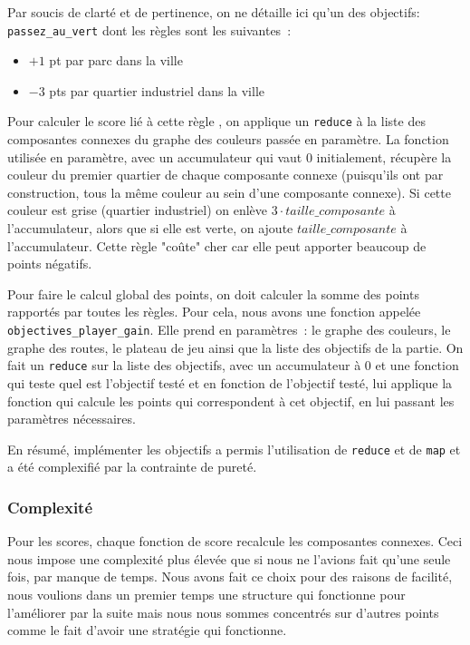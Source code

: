 Par soucis de clarté et de pertinence, on ne détaille ici qu'un des objectifs: \texttt{passez\_au\_vert} dont les règles sont les suivantes~:
\begin{itemize}
    \item  $+1$ pt par parc dans la ville
    \item  $-3$ pts par quartier industriel dans la ville
\end{itemize}

Pour calculer le score lié à cette règle , on applique un \texttt{reduce} à la liste des composantes connexes du graphe des couleurs passée en paramètre. La fonction utilisée en paramètre, avec un accumulateur qui vaut 0 initialement, récupère la couleur du premier quartier de chaque composante connexe (puisqu'ils ont par construction, tous la même couleur au sein d'une composante connexe). Si cette couleur est grise (quartier industriel) on enlève $3 \cdot taille\_composante$ à l'accumulateur, alors que si elle est verte, on ajoute $taille\_composante$ à l'accumulateur.
Cette règle "coûte" cher car elle peut apporter beaucoup de points négatifs.

Pour faire le calcul global des points, on doit calculer la somme des points rapportés par toutes les règles. Pour cela, nous avons une fonction appelée \texttt{objectives\_player\_gain}. Elle prend en paramètres~: le graphe des couleurs, le graphe des routes, le plateau de jeu ainsi que la liste des objectifs de la partie. On fait un \texttt{reduce} sur la liste des objectifs, avec un accumulateur à 0 et une fonction qui teste quel est l'objectif testé et en fonction de l'objectif testé, lui applique la fonction qui calcule les points qui correspondent à cet objectif, en lui passant les paramètres nécessaires.

En résumé, implémenter les objectifs a permis l'utilisation de \texttt{reduce} et de \texttt{map} et a été complexifié par la contrainte de pureté.
\subsubsection{Complexité}
Pour les scores, chaque fonction de score recalcule les composantes connexes. Ceci nous impose une complexité plus élevée que si nous ne l'avions fait qu'une seule fois, par manque de temps. Nous avons fait ce choix pour des raisons de facilité, nous voulions dans un premier temps une structure qui fonctionne pour l'améliorer par la suite mais nous nous sommes concentrés sur d'autres points comme le fait d'avoir une stratégie qui fonctionne.

